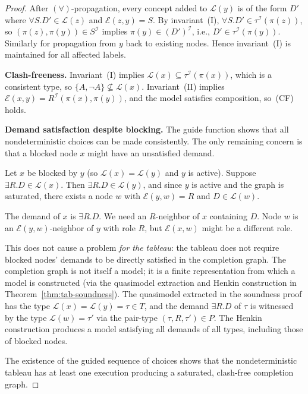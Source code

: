 \documentclass[a4paper,11pt]{article}
\theoremstyle{definition}
\newcommand{\interp}{\ensuremath{\mathcal{I}}}
\begin{document}
\begin{proof}
\noindent After $(\forall)$-propagation, every concept added to
$\mathcal{L}(y)$ is of the form $D'$ where $\forall S.D' \in
\mathcal{L}(z)$ and $\mathcal{E}(z,y) = S$.  By invariant~(I),
$\forall S.D' \in \tau^{\interp}(\pi(z))$, so $(\pi(z), \pi(y)) \in
S^{\interp}$ implies $\pi(y) \in (D')^{\interp}$, i.e., $D' \in
\tau^{\interp}(\pi(y))$.  Similarly for propagation from $y$ back to
existing nodes.  Hence invariant~(I) is maintained for all affected
labels.

\medskip\noindent\textbf{Clash-freeness.}\;
Invariant~(I) implies $\mathcal{L}(x) \subseteq
\tau^{\interp}(\pi(x))$, which is a consistent type, so $\{A, \neg A\}
\not\subseteq \mathcal{L}(x)$.  Invariant~(II) implies
$\mathcal{E}(x,y) = R^{\interp}(\pi(x), \pi(y))$, and the model
satisfies composition, so~(CF) holds.

\medskip\noindent\textbf{Demand satisfaction despite blocking.}\;
The guide function shows that all nondeterministic choices can be made
consistently.  The only remaining concern is that a blocked node $x$
might have an unsatisfied demand.

Let $x$ be blocked by $y$ (so $\mathcal{L}(x) = \mathcal{L}(y)$ and
$y$ is active).  Suppose $\exists R.D \in \mathcal{L}(x)$.  Then
$\exists R.D \in \mathcal{L}(y)$, and since $y$ is active and the
graph is saturated, there exists a node $w$ with $\mathcal{E}(y,w) =
R$ and $D \in \mathcal{L}(w)$.

The demand of $x$ is $\exists R.D$.  We need an $R$-neighbor of $x$
containing $D$.  Node $w$ is an $\mathcal{E}(y,w)$-neighbor of $y$
with role $R$, but $\mathcal{E}(x,w)$ might be a different role.

This does not cause a problem \emph{for the tableau}: the tableau does
not require blocked nodes' demands to be directly satisfied in the
completion graph.  The completion graph is not itself a model; it is a
finite representation from which a model is constructed (via the
quasimodel extraction and Henkin construction in
Theorem~\ref{thm:tab-soundness}).  The quasimodel extracted in the
soundness proof has the type $\mathcal{L}(x) = \mathcal{L}(y) = \tau
\in T$, and the demand $\exists R.D$ of $\tau$ is witnessed by the
type $\mathcal{L}(w) = \tau'$ via the pair-type $(\tau, R, \tau') \in
P$.  The Henkin construction produces a model satisfying all demands of
all types, including those of blocked nodes.

\medskip\noindent The existence of the guided sequence of choices
shows that the nondeterministic tableau has at least one execution
producing a saturated, clash-free completion graph.
\end{proof}
\end{document}
